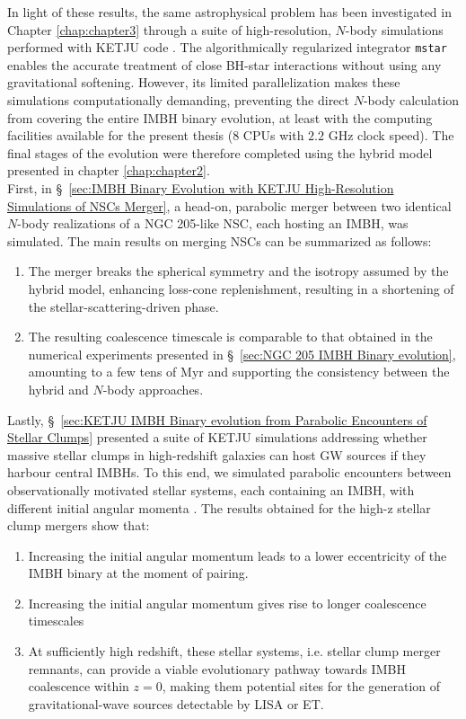 \documentclass[12pt,twoside,openany]{book}
\begin{document}
In light of these results, the same astrophysical problem has been investigated in Chapter \ref{chap:chapter3} through a suite of high-resolution, $N$-body simulations performed with KETJU code \parencite{Mannerkoski_2023}. The algorithmically regularized integrator \texttt{mstar} enables the accurate treatment of close BH-star interactions without using any gravitational softening. However, its limited parallelization makes these simulations computationally demanding, preventing the direct $N$-body calculation from covering the entire IMBH binary evolution, at least with the computing facilities available for the present thesis (8 CPUs with $2.2$ GHz clock speed). The final stages of the evolution were therefore completed using the hybrid model presented in chapter \ref{chap:chapter2}.\\First, in \S~\ref{sec:IMBH Binary Evolution with KETJU High-Resolution Simulations of NSCs Merger}, a head-on, parabolic merger between two identical $N$-body realizations of a NGC 205-like NSC, each hosting an IMBH, was simulated. The main results on merging NSCs can be summarized as follows:
\begin{enumerate}
\item The merger breaks the spherical symmetry and the isotropy assumed by the hybrid model, enhancing loss-cone replenishment, resulting in a shortening of the stellar-scattering-driven phase.
\item The resulting coalescence timescale is comparable to that obtained in the numerical experiments presented in \S~\ref{sec:NGC 205 IMBH Binary evolution}, amounting to a few tens of $\mathrm{Myr}$ and supporting the consistency between the hybrid and $N$-body approaches.
\end{enumerate}
Lastly, \S~\ref{sec:KETJU IMBH Binary evolution from Parabolic Encounters of Stellar Clumps} presented a suite of KETJU simulations addressing whether massive stellar clumps in high-redshift galaxies can host GW sources if they harbour central IMBHs. To this end, we simulated parabolic encounters between observationally motivated stellar systems, each containing an IMBH, with different initial angular momenta \parencite{Eros_2026}. The results obtained for the high-z stellar clump mergers show that:
\begin{enumerate}
\item Increasing the initial angular momentum leads to a lower eccentricity of the IMBH binary at the moment of pairing.
\item Increasing the initial angular momentum gives rise to longer coalescence timescales
\item At sufficiently high redshift, these stellar systems, i.e. stellar clump merger remnants, can provide a viable evolutionary pathway towards IMBH coalescence within $z=0$, making them potential sites for the generation of gravitational-wave sources detectable by LISA or ET.
\end{enumerate}
\end{document}
